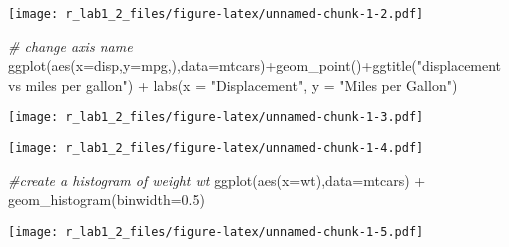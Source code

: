 \documentclass[
]{article}
\newenvironment{Shaded}{\begin{snugshade}}{\end{snugshade}}
\newcommand{\AttributeTok}[1]{\textcolor[rgb]{0.77,0.63,0.00}{#1}}
\newcommand{\CommentTok}[1]{\textcolor[rgb]{0.56,0.35,0.01}{\textit{#1}}}
\newcommand{\FloatTok}[1]{\textcolor[rgb]{0.00,0.00,0.81}{#1}}
\newcommand{\FunctionTok}[1]{\textcolor[rgb]{0.00,0.00,0.00}{#1}}
\newcommand{\NormalTok}[1]{#1}
\newcommand{\OtherTok}[1]{\textcolor[rgb]{0.56,0.35,0.01}{#1}}
\newcommand{\SpecialCharTok}[1]{\textcolor[rgb]{0.00,0.00,0.00}{#1}}
\newcommand{\StringTok}[1]{\textcolor[rgb]{0.31,0.60,0.02}{#1}}
\begin{document}
\texttt{[image: r\_lab1\_2\_files/figure-latex/unnamed-chunk-1-2.pdf]}

\begin{Shaded}
\begin{Highlighting}[]
\CommentTok{\# change axis name}
\FunctionTok{ggplot}\NormalTok{(}\FunctionTok{aes}\NormalTok{(}\AttributeTok{x=}\NormalTok{disp,}\AttributeTok{y=}\NormalTok{mpg,),}\AttributeTok{data=}\NormalTok{mtcars)}\SpecialCharTok{+}\FunctionTok{geom\_point}\NormalTok{()}\SpecialCharTok{+}\FunctionTok{ggtitle}\NormalTok{(}\StringTok{"displacement vs miles per gallon"}\NormalTok{) }\SpecialCharTok{+} \FunctionTok{labs}\NormalTok{(}\AttributeTok{x =} \StringTok{"Displacement"}\NormalTok{, }\AttributeTok{y =} \StringTok{"Miles per Gallon"}\NormalTok{)}
\end{Highlighting}
\end{Shaded}

\texttt{[image: r\_lab1\_2\_files/figure-latex/unnamed-chunk-1-3.pdf]}

\begin{Shaded}
\end{Shaded}

\texttt{[image: r\_lab1\_2\_files/figure-latex/unnamed-chunk-1-4.pdf]}

\begin{Shaded}
\begin{Highlighting}[]
\CommentTok{\#create a histogram of weight wt}
\FunctionTok{ggplot}\NormalTok{(}\FunctionTok{aes}\NormalTok{(}\AttributeTok{x=}\NormalTok{wt),}\AttributeTok{data=}\NormalTok{mtcars) }\SpecialCharTok{+} \FunctionTok{geom\_histogram}\NormalTok{(}\AttributeTok{binwidth=}\FloatTok{0.5}\NormalTok{)}
\end{Highlighting}
\end{Shaded}

\texttt{[image: r\_lab1\_2\_files/figure-latex/unnamed-chunk-1-5.pdf]}
\end{document}

